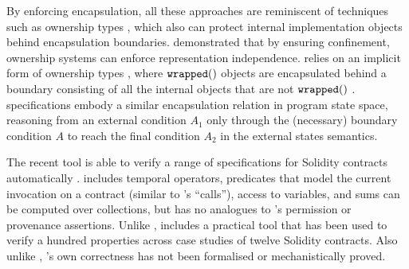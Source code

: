





By enforcing encapsulation, %
all these approaches are reminiscent of techniques such as
ownership types \cite{ownalias,NobPotVitECOOP98},
which also can 
protect internal implementation objects behind 
encapsulation boundaries.  \cite{Banerjee:2005,encaps} demonstrated that by
ensuring confinement, ownership
systems can enforce representation independence.
\Nec relies on an implicit form of ownership types \cite{confined},
where $\texttt{wrapped}(  )$ objects are encapsulated behind a boundary 
consisting of all the internal objects that are not $\texttt{wrapped}(  )$
\cite{TAME2003}. \Nec specifications embody a similar encapsulation
relation in program state space, \eg reasoning
from an external condition $A_1$ only through the (necessary) boundary
condition $A$ to reach the final condition $A_2$ in the external
states semantics.







The recent {} tool is able to verify a range of
specifications for Solidity contracts automatically \cite{VerX}.
{} includes  temporal operators, predicates that
model the current invocation on a contract (similar to \Nec's
``calls''), access to variables, 
and sums can be computed over collections,
but has no analogues to \Nec's permission or provenance assertions.
%
%
Unlike \Nec, {} includes a practical tool that has
been used to verify a hundred properties across case studies of
twelve Solidity contracts. Also unlike \Nec, {}'s own correctness
has not been formalised or mechanistically proved. 

